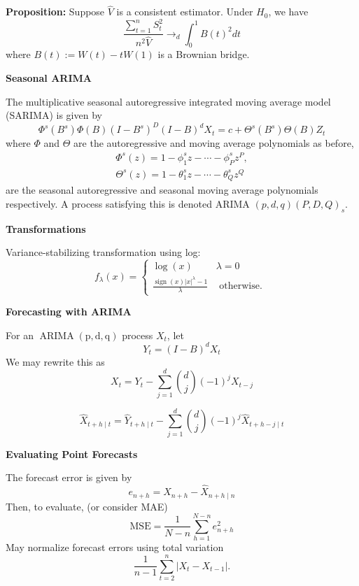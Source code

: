 \documentclass[a4paper]{article}
\newcommand{\subheading}[1]{{\scriptsize\textbf{#1}}}
\begin{document}
\begin{multicols*}{4}
\textbf{Proposition:} Suppose $\hat{V}$ is a consistent estimator. Under $H_{0}$, we have
$$
\frac{\sum_{t=1}^{n} S_{t}^{2}}{n^{2} \hat{V}} \rightarrow_{d} \int_{0}^{1} B(t)^{2} d t
$$
where $B(t):=W(t)-t W(1)$ is a Brownian bridge.

\smallskip
\hline
\smallskip

\subheading{Seasonal ARIMA}

The multiplicative seasonal autoregressive integrated moving average model (SARIMA) is given by
$$
\Phi^{s}(B^{s}) \Phi(B)(I-B^{s})^{D}(I-B)^{d} X_{t}=c+\Theta^{s}(B^{s}) \Theta(B) Z_{t}
$$
where $\Phi$ and $\Theta$ are the autoregressive and moving average polynomials as before,
$$
\begin{gathered}
\Phi^{s}(z)=1-\phi_{1}^{s} z-\cdots-\phi_{P}^{s} z^{P}, \\
\Theta^{s}(z)=1-\theta_{1}^{s} z-\cdots-\theta_{Q}^{s} z^{Q}
\end{gathered}
$$
are the seasonal autoregressive and seasonal moving average polynomials respectively. A process satisfying this is denoted ARIMA $(p, d, q)(P, D, Q)_{s}$.

\subheading{Transformations}

Variance-stabilizing transformation using log:
$$
f_{\lambda}(x)= \begin{cases}\log (x) & \lambda=0 \\ \frac{\operatorname{sign}(x)|x|^{\lambda}-1}{\lambda} & \text { otherwise. }\end{cases}
$$

\smallskip
\hline
\smallskip

\subheading{Forecasting with ARIMA}

For an $\operatorname{ARIMA}(\mathrm{p}, \mathrm{d}, \mathrm{q})$ process $X_{t}$, let $$Y_{t}=(I-B)^{d} X_{t}$$ 
We may rewrite this as
$$
X_{t}=Y_{t}-\sum_{j=1}^{d} {d \choose j} (-1)^{j} X_{t-j}
$$

$$
\hat{X}_{t+h \mid t}=\hat{Y}_{t+h \mid t}-\sum_{j=1}^{d}{d \choose j}(-1)^{j} \hat{X}_{t+h-j \mid t}
$$
\smallskip
\hline
\smallskip

\subheading{Evaluating Point Forecasts}

The forecast error is given by
$$
e_{n+h}=X_{n+h}-\hat{X}_{n+h \mid n}
$$
Then, to evaluate, (or consider MAE)
$$
\mathrm{MSE} =\frac{1}{N-n} \sum_{h=1}^{N-n} e_{n+h}^{2}
$$
May normalize forecast errors using total variation
$$
\frac{1}{n-1} \sum_{t=2}^{n}\left|X_{t}-X_{t-1}\right| .
$$

\smallskip
\hline
\smallskip


\end{multicols*}
\end{document}
